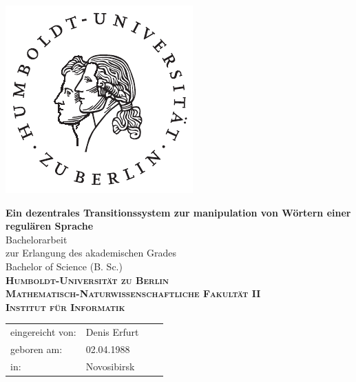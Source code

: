 \begin{titlepage}
\hspace{20cm}
\vspace{-2cm}
 
\begin{flushright}
\includegraphics[width=3.2 cm]{bilder/husiegel.pdf}
\end{flushright}
 
 
\begin{center}
  \vspace{0.5 cm}
  \huge{\bf Ein dezentrales Transitionssystem zur manipulation von Wörtern einer regulären Sprache} \\ %
  \vspace{1 cm}
  \LARGE  Bachelorarbeit \\ %
  \vspace{1cm}
  \Large zur Erlangung des akademischen Grades \\
  Bachelor of Science (B. Sc.) \\ %
  \vspace{1.5cm}
  {\large
    \bf{
      \scshape
      Humboldt-Universit\"at zu Berlin \\
      Mathematisch-Naturwissenschaftliche Fakult\"at II \\
      Institut f\"ur Informatik\\
    }
  } 
\end{center}
\vspace{3 cm}
{\large
  \begin{tabular}{llll}
    eingereicht von:    & Denis Erfurt && \\ %
    geboren am:         & 02.04.1988 && \\
    in:                 & Novosibirsk && \\

\end{tabular}}
\end{titlepage}
